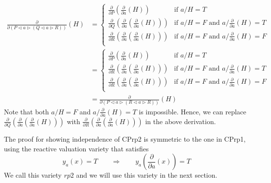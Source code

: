 \documentclass[a4paper,twoside,openright]{report}
\newcommand{\dd}[1]{\frac{\partial}{\partial #1}}
\newcommand{\lef}{\ensuremath{\triangleleft}}
\newcommand{\rig}{\ensuremath{\triangleright}}
\begin{document}
\begin{align*}
\dd{(P\lef a\rig(Q\lef a\rig R))}(H)
&=\begin{cases}
\dd P(\dd a(H)) & \text{if $a/H=T$}\\
\dd Q(\dd a(\dd a(H))) & \text{if $a/H=F$ and $a/\dd a(H)=T$}\\
\dd R(\dd a(\dd a(H))) & \text{if $a/H=F$ and $a/\dd a(H)=F$}\\
\end{cases}\\
&=\begin{cases}
\dd P(\dd a(H)) & \text{if $a/H=T$}\\
\dd R(\dd a(\dd a(H))) & \text{if $a/H=F$ and $a/\dd a(H)=T$}\\
\dd R(\dd a(\dd a(H))) & \text{if $a/H=F$ and $a/\dd a(H)=F$}\\
\end{cases}\\
&=\dd{(P\lef a\rig(R\lef a\rig R))}(H)
\end{align*}
Note that both $a/H=F$ and $a/\dd a(H)=T$ is impossible. Hence, we can replace $\dd Q(\dd a(\dd a(H)))$ with $\dd R(\dd a(\dd a(H)))$ in the above derivation.

The proof for showing independence of CPrp2 is symmetric to the one in CPrp1, using the reactive valuation variety that satisfies
\[
y_a(x)=T\qquad\Longrightarrow\qquad y_a(\dd a(x))=T
\]
We call this variety $rp2$ and we will use this variety in the next section.
\end{document}
